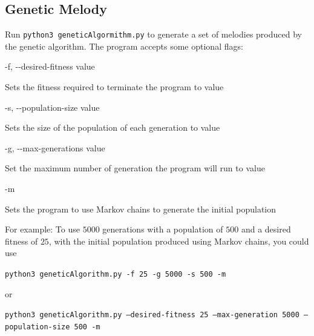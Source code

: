 \subsection{Genetic Melody} \label{software:howtouse:ga}

Run \texttt{python3 geneticAlgormithm.py} to generate a set of melodies produced by the genetic algorithm.
The program accepts some optional flags:

\noindent -f, -{}-desired-fitness value 

Sets the fitness required to terminate the program to value

\noindent -s, -{}-population-size value

Sets the size of the population of each generation to value

\noindent -g, -{}-max-generations value

Set the maximum number of generation the program will run to value

\noindent -m

Sets the program to use Markov chains to generate the initial population

For example: To use $5000$ generations with a population of $500$ and a desired fitness of $25$, with the initial population produced using Markov chains, you could use

\texttt{python3 geneticAlgorithm.py -f 25 -g 5000 -s 500 -m}

\noindent or

\texttt{python3 geneticAlgorithm.py --desired-fitness 25 --max-generation 5000 --population-size 500 -m}
